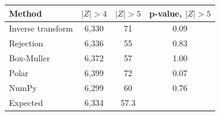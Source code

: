 \begin{tabular}{lccc}
\toprule
Method & $|Z| > 4$ & $|Z| > 5$ & p-value, $|Z| > 5$ \\
\midrule
Inverse transform & 6{,}330 & 71 & 0.09 \\
Rejection & 6{,}336 & 55 & 0.83 \\
Box-Muller & 6{,}372 & 57 & 1.00 \\
Polar & 6{,}399 & 72 & 0.07 \\
NumPy & 6{,}299 & 60 & 0.76 \\
Expected & 6{,}334 & 57.3 &  \\
\bottomrule
\end{tabular}

